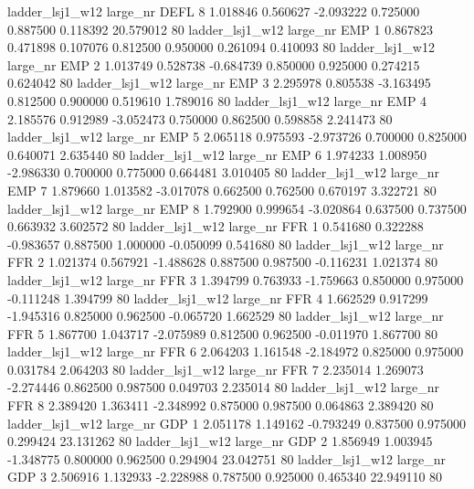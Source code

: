     ladder_lsj1_w12   large_nr     DEFL                 8  1.018846  0.560627  -2.093222 0.725000 0.887500  0.118392   20.579012 80
    ladder_lsj1_w12   large_nr      EMP                 1  0.867823  0.471898   0.107076 0.812500 0.950000  0.261094    0.410093 80
    ladder_lsj1_w12   large_nr      EMP                 2  1.013749  0.528738  -0.684739 0.850000 0.925000  0.274215    0.624042 80
    ladder_lsj1_w12   large_nr      EMP                 3  2.295978  0.805538  -3.163495 0.812500 0.900000  0.519610    1.789016 80
    ladder_lsj1_w12   large_nr      EMP                 4  2.185576  0.912989  -3.052473 0.750000 0.862500  0.598858    2.241473 80
    ladder_lsj1_w12   large_nr      EMP                 5  2.065118  0.975593  -2.973726 0.700000 0.825000  0.640071    2.635440 80
    ladder_lsj1_w12   large_nr      EMP                 6  1.974233  1.008950  -2.986330 0.700000 0.775000  0.664481    3.010405 80
    ladder_lsj1_w12   large_nr      EMP                 7  1.879660  1.013582  -3.017078 0.662500 0.762500  0.670197    3.322721 80
    ladder_lsj1_w12   large_nr      EMP                 8  1.792900  0.999654  -3.020864 0.637500 0.737500  0.663932    3.602572 80
    ladder_lsj1_w12   large_nr      FFR                 1  0.541680  0.322288  -0.983657 0.887500 1.000000 -0.050099    0.541680 80
    ladder_lsj1_w12   large_nr      FFR                 2  1.021374  0.567921  -1.488628 0.887500 0.987500 -0.116231    1.021374 80
    ladder_lsj1_w12   large_nr      FFR                 3  1.394799  0.763933  -1.759663 0.850000 0.975000 -0.111248    1.394799 80
    ladder_lsj1_w12   large_nr      FFR                 4  1.662529  0.917299  -1.945316 0.825000 0.962500 -0.065720    1.662529 80
    ladder_lsj1_w12   large_nr      FFR                 5  1.867700  1.043717  -2.075989 0.812500 0.962500 -0.011970    1.867700 80
    ladder_lsj1_w12   large_nr      FFR                 6  2.064203  1.161548  -2.184972 0.825000 0.975000  0.031784    2.064203 80
    ladder_lsj1_w12   large_nr      FFR                 7  2.235014  1.269073  -2.274446 0.862500 0.987500  0.049703    2.235014 80
    ladder_lsj1_w12   large_nr      FFR                 8  2.389420  1.363411  -2.348992 0.875000 0.987500  0.064863    2.389420 80
    ladder_lsj1_w12   large_nr      GDP                 1  2.051178  1.149162  -0.793249 0.837500 0.975000  0.299424   23.131262 80
    ladder_lsj1_w12   large_nr      GDP                 2  1.856949  1.003945  -1.348775 0.800000 0.962500  0.294904   23.042751 80
    ladder_lsj1_w12   large_nr      GDP                 3  2.506916  1.132933  -2.228988 0.787500 0.925000  0.465340   22.949110 80
